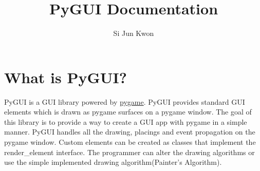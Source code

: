 \documentclass{article}
\title{PyGUI Documentation}
\author{Si Jun Kwon}
\date{\displaydate{date}}
\begin{document}
    \maketitle
    \newpage
    \tableofcontents
    \newpage
    \section{What is PyGUI?}
    PyGUI is a GUI library powered by \href{https://www.pygame.org/}{pygame}. PyGUI provides
    standard GUI elements which is drawn as pygame surfaces on a pygame window. The goal of this library
    is to provide a way to create a GUI app with pygame in a simple manner. PyGUI handles all the drawing,
    placings and event propagation on the pygame window. Custom elements can be created as classes that
    implement the render\_element interface. The programmer can alter the drawing algorithms or use the 
    simple implemented drawing algorithm(Painter's Algorithm).
\end{document}
